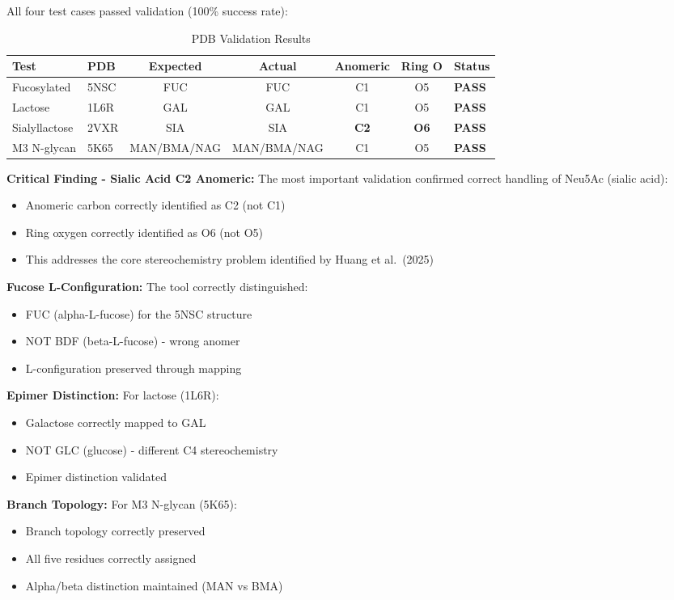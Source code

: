 All four test cases passed validation (100\% success rate):

\begin{table}[h]
\centering
\caption{PDB Validation Results}
\begin{tabular}{llccccl}
\toprule
Test & PDB & Expected & Actual & Anomeric & Ring O & Status \\
\midrule
Fucosylated & 5NSC & FUC & FUC & C1 & O5 & \textbf{PASS} \\
Lactose & 1L6R & GAL & GAL & C1 & O5 & \textbf{PASS} \\
Sialyllactose & 2VXR & SIA & SIA & \textbf{C2} & \textbf{O6} & \textbf{PASS} \\
M3 N-glycan & 5K65 & MAN/BMA/NAG & MAN/BMA/NAG & C1 & O5 & \textbf{PASS} \\
\bottomrule
\end{tabular}
\end{table}

\textbf{Critical Finding - Sialic Acid C2 Anomeric:} The most important validation confirmed correct handling of Neu5Ac (sialic acid):
\begin{itemize}
\item Anomeric carbon correctly identified as C2 (not C1)
\item Ring oxygen correctly identified as O6 (not O5)
\item This addresses the core stereochemistry problem identified by Huang et al.\ (2025)
\end{itemize}

\textbf{Fucose L-Configuration:} The tool correctly distinguished:
\begin{itemize}
\item FUC (alpha-L-fucose) for the 5NSC structure
\item NOT BDF (beta-L-fucose) - wrong anomer
\item L-configuration preserved through mapping
\end{itemize}

\textbf{Epimer Distinction:} For lactose (1L6R):
\begin{itemize}
\item Galactose correctly mapped to GAL
\item NOT GLC (glucose) - different C4 stereochemistry
\item Epimer distinction validated
\end{itemize}

\textbf{Branch Topology:} For M3 N-glycan (5K65):
\begin{itemize}
\item Branch topology correctly preserved
\item All five residues correctly assigned
\item Alpha/beta distinction maintained (MAN vs BMA)
\end{itemize}

